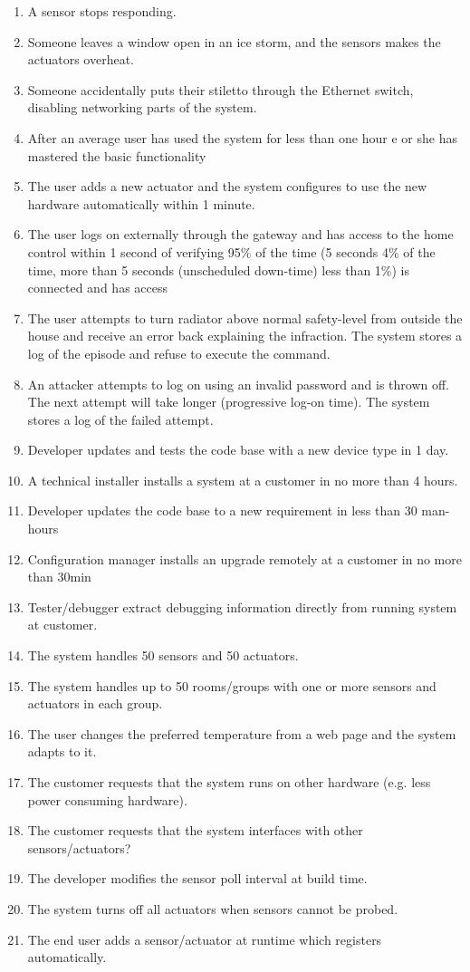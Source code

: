 \documentclass[a4paper,10pt]{article}
\begin{document}
\begin{enumerate}
\item A sensor stops responding.
\item Someone leaves a window open in an ice storm, and the sensors makes the actuators overheat.
\item Someone accidentally puts their stiletto through the Ethernet switch, disabling networking 
parts of the system.
\item After an average user has used the system for less than one hour e or she has mastered the basic functionality
\item The user adds a new actuator and the system configures to use the new hardware automatically within 1 minute.
\item The user logs on externally through the gateway and has access to the home control within 1 second of verifying 95\% of the time (5 seconds 4\% of the time, more than 5 seconds (unscheduled down-time) less than 1\%) is connected and has access
\item The user attempts to turn radiator above normal safety-level from outside the house and receive an error back explaining the infraction. The system stores a log of the episode and refuse to execute the command.
\item An attacker attempts to log on using an invalid password and is thrown off. The next attempt will take longer (progressive log-on time). The system stores a log of the failed attempt.
\item Developer updates and tests the code base with a new device type in 1 day.
\item A technical installer installs a system at a customer in no more than 4 hours.
\item Developer updates the code base to a new requirement in less than 30 man-hours
\item Configuration manager installs an upgrade remotely at a customer in no more than 30min
\item Tester/debugger extract debugging information directly from running system at customer.
\item The system handles 50 sensors and 50 actuators.
\item The system handles up to 50 rooms/groups with one or more sensors and actuators in each group.
\item The user changes the preferred temperature from a web page and the system adapts to it.
\item The customer requests that the system runs on other hardware (e.g. less power consuming hardware).
\item The customer requests that the system interfaces with other sensors/actuators?
\item The developer modifies the sensor poll interval at build time.
\item The system turns off all actuators when sensors cannot be probed.
\item The end user adds a sensor/actuator at runtime which registers automatically.
\end{enumerate}
\end{document}
